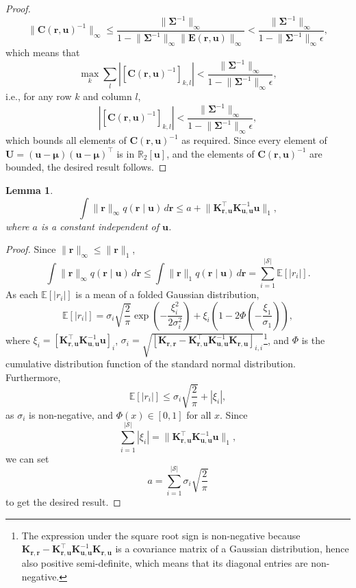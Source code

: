 \documentclass{mpaper}
\newtheorem{lemma}[theorem]{Lemma}
\newcommand{\rinf}{\lVert \mathbf{r} \rVert_\infty}
\newcommand{\Kuu}{\mathbf{K}_{\mathbf{u},\mathbf{u}}}
\newcommand{\Krr}{\mathbf{K}_{\mathbf{r},\mathbf{r}}}
\newcommand{\Kru}{\mathbf{K}_{\mathbf{r},\mathbf{u}}}
\begin{document}
\begin{proof}
  \[
    \lVert \mathbf{C}(\mathbf{r}, \mathbf{u})^{-1} \rVert_\infty \le
    \frac{\lVert \bm\Sigma^{-1} \rVert_\infty}{1 - \lVert \bm\Sigma^{-1}
      \rVert_\infty \lVert \mathbf{E}(\mathbf{r}, \mathbf{u}) \rVert_\infty} <
    \frac{\lVert \bm\Sigma^{-1} \rVert_\infty}{1 - \lVert \bm\Sigma^{-1}
      \rVert_\infty \epsilon},
  \]
  which means that
  \[
    \max_k \sum_l \left| [\mathbf{C}(\mathbf{r}, \mathbf{u})^{-1}]_{k,l} \right|
    < \frac{\lVert \bm\Sigma^{-1} \rVert_\infty}{1 - \lVert \bm\Sigma^{-1}
      \rVert_\infty \epsilon},
  \]
  i.e., for any row $k$ and column $l$,
  \[
    \left| [\mathbf{C}(\mathbf{r}, \mathbf{u})^{-1}]_{k,l} \right| <
    \frac{\lVert \bm\Sigma^{-1} \rVert_\infty}{1 - \lVert \bm\Sigma^{-1}
      \rVert_\infty \epsilon},
  \]
  which bounds all elements of $\mathbf{C}(\mathbf{r}, \mathbf{u})^{-1}$ as
  required. Since every element of $\mathbf{U} = (\mathbf{u} - \bm\mu)(\mathbf{u} -
  \bm\mu)^\intercal$ is in $\mathbb{R}_2[\mathbf{u}]$, and the elements of
  $\mathbf{C}(\mathbf{r}, \mathbf{u})^{-1}$ are bounded, the desired result
  follows.
\end{proof}

\begin{lemma} \label{lemma:integral_of_r}
  \[
    \int \lVert \mathbf{r} \rVert_\infty q(\mathbf{r} \mid \mathbf{u})\,d\mathbf{r} \le a +
    \lVert \Kru^\intercal \Kuu^{-1} \mathbf{u} \rVert_1,
  \]
  where $a$ is a constant independent of $\mathbf{u}$.
\end{lemma}
\begin{proof}
  Since $\rinf \le \lVert \mathbf{r} \rVert_1$,
  \[
    \int \lVert \mathbf{r} \rVert_\infty q(\mathbf{r} \mid \mathbf{u})\,d\mathbf{r} \le \int
    \lVert \mathbf{r} \rVert_1 q(\mathbf{r} \mid \mathbf{u})\,d\mathbf{r} =
    \sum_{i=1}^{|\mathcal{S}|} \mathbb{E}[|r_i|].
  \]
  As each $\mathbb{E}[|r_i|]$ is a mean of a folded Gaussian distribution,
  \[
    \mathbb{E}[|r_i|] = \sigma_i \sqrt{\frac{2}{\pi}} \exp
    \left(-\frac{\xi_i^2}{2\sigma_i^2} \right) + \xi_i \left( 1 - 2\Phi \left(
        -\frac{\xi_1}{\sigma_1} \right) \right),
  \]
  where $\xi_i = \left[\Kru^\intercal\Kuu^{-1}\mathbf{u}\right]_i$, $\sigma_i =
  \sqrt{[\Krr - \Kru^\intercal\Kuu^{-1}\Kru]_{i,i}}$\footnote{The expression
    under the square root sign is non-negative because $\Krr -
    \Kru^\intercal\Kuu^{-1}\Kru$ is a covariance matrix of a Gaussian
    distribution, hence also positive semi-definite, which means that its
    diagonal entries are non-negative.}, and $\Phi$ is the cumulative
  distribution function of the standard normal distribution. Furthermore,
  \[
    \mathbb{E}[|r_i|] \le \sigma_i\sqrt{\frac{2}{\pi}} + |\xi_i|,
  \]
  as $\sigma_i$ is non-negative, and $\Phi(x) \in [0, 1]$ for all $x$. Since
  \[ \sum_{i=1}^{|\mathcal{S}|} |\xi_i| = \lVert \Kru^\intercal \Kuu^{-1}
    \mathbf{u} \rVert_1, \]
  we can set
  \[ a = \sum_{i=1}^{|\mathcal{S}|} \sigma_i \sqrt{\frac{2}{\pi}} \]
  to get the desired result.
\end{proof}
\end{document}
